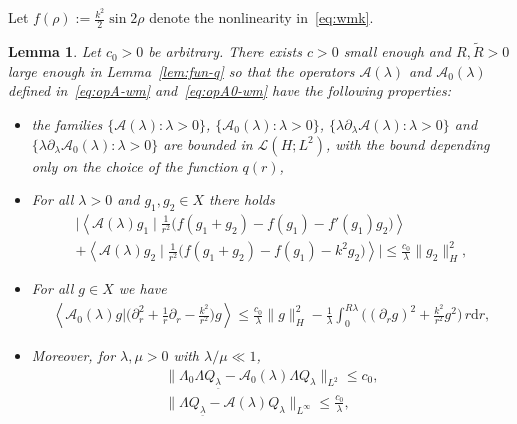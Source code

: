 \documentclass[10pt,reqno]{amsart}
\newcommand{\vd}{\mathrm{d}}
\newcommand{\udr}{\,r\vd r}
\newcommand{\uln}[1]{{\underline{ #1 }}}
\newcommand{\Red}[1]{{\color{red} #1}}
\newcommand{\A}{\mathcal{A}}
\newcommand{\la}{\lambda}
\newcommand{\ti}{\widetilde}
\newcommand{\ang}[1]{\left\langle{#1}\right\rangle}
\newcommand{\EQ}[1]{\begin{equation}\begin{split} #1 \end{split}\end{equation}}
\numberwithin{equation}{section}
\newtheorem{lem}[thm]{Lemma}
\theoremstyle{remark}
\newcounter{parts}
\newcommand{\0}{\emptyset}
\newcommand{\eps}{\epsilon}
\begin{document}
Let 
$
f(\rho):= \frac{k^2}{2} \sin 2 \rho
$
denote the nonlinearity in~\eqref{eq:wmk}. 
\begin{lem} \emph{\cite[Lemma 5.5]{JJ-AJM}}
  \label{lem:op-A-wm}
  Let $c_0>0$ be arbitrary. There exists $c>0$ small enough and $R, \ti R>0$ large enough in Lemma~\ref{lem:fun-q} so that the operators $\A(\lambda)$ and $\A_0(\lambda)$ defined in~\eqref{eq:opA-wm} and~\eqref{eq:opA0-wm} have the following properties:
  \begin{itemize}[leftmargin=0.5cm]
    \item the families $\{\A(\lambda): \lambda > 0\}$, $\{\A_0(\lambda): \lambda > 0\}$, $\{\lambda\partial_\lambda \A(\lambda): \lambda > 0\}$
      and $\{\lambda\partial_\lambda \A_0(\lambda): \lambda > 0\}$ are bounded in $\mathscr{L}(H; L^2)$, with the bound depending only on the choice of the function $q(r)$,
    \item %
    For all $\lambda > 0$ and $g_1, g_2 \in X$  there holds
      \begin{multline}  \label{eq:A-by-parts-wm}
      \Big| \ang{ \A(\lambda)g_1\mid  \frac{1}{r^2}\big(f(g_1 + g_2) - f(g_1) - f'(g_1)g_2\big)}  \\ +\ang{ \A(\lambda)g_2\mid \frac{1}{r^2}\big(f(g_1+g_2) - f(g_1) -k^2 g_2\big)}\Big| 
        \leq \frac{c_0}{\lambda} \|g_2\|_H^2, 
      \end{multline}
    \item For all $g \in X$ we have  %
\EQ{
        \label{eq:A-pohozaev-wm}
        \ang{\A_0(\lambda)g | \big(\partial_r^2 + \frac 1r\partial_r - \frac{k^2}{r^2}\big)g} \leq \frac{c_0}{\lambda}\|g\|_{H}^2 - \frac{1}{\lambda}\int_0^{R\lambda}\Big((\partial_r g)^2 + \frac{k^2}{r^2}g^2\Big) \udr, 
        }
        \item Moreover, for $\la, \mu >0$ with $\la/\mu \ll 1$, %
 \begin{gather}
      \label{eq:L0-A0-wm}
      \|\Lambda_0 \Lambda Q_\uln{\lambda} - \A_0(\lambda)\Lambda Q_{\lambda}\|_{L^2} \leq c_0, \\
      \label{eq:L-A-wm}
      \|\Lambda Q_\uln\lambda - \A(\lambda)Q_\lambda\|_{L^\infty} \leq \frac{c_0}{\lambda},  \\

\end{gather}
\end{itemize}
\end{lem}
\end{document}
